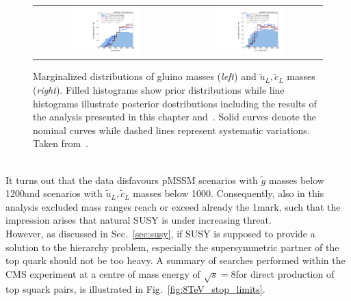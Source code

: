 \begin{figure}[!h]
  \centering
  \begin{tabular}{cc}
                \includegraphics[width=0.49\textwidth]{figures/pMSSM_gluino.pdf} &
                \includegraphics[width=0.49\textwidth]{figures/pMSSM_squark.pdf} 
  \end{tabular}
\caption{Marginalized distributions of gluino masses (\textit{left}) and $\tilde{u}_L,\tilde{c}_L$ masses (\textit{right}). Filled histograms show prior distributions while line histograms illustrate posterior dostributions including the results of the analysis presented in this chapter and~\cite{Chatrchyan:2012lia}. Solid curves denote the nominal curves while dashed lines represent systematic variations. Taken from~\cite{CMS-PAS-SUS-13-020}.} 
  \label{fig:pMSSM}
\end{figure}
\\
It turns out that the data disfavours pMSSM scenarios with $\tilde{g}$ masses below 1200\gev and scenarios with $\tilde{u}_L,\tilde{c}_L$ masses below 1000\gev. Consequently, also in this analysis excluded mass ranges reach or exceed already the 1\tev mark, such that the impression arises that natural SUSY is under increasing threat. \\
However, as discussed in Sec.~\ref{sec:susy}, if SUSY is supposed to provide a solution to the hierarchy problem, especially the supersymmetric partner of the top quark should not be too heavy. A summary of searches performed within the CMS experiment at a centre of mass energy of $\sqrt{s} = 8$\tev for direct production of top squark pairs, is illustrated in Fig.~\ref{fig:8TeV_stop_limits}.
